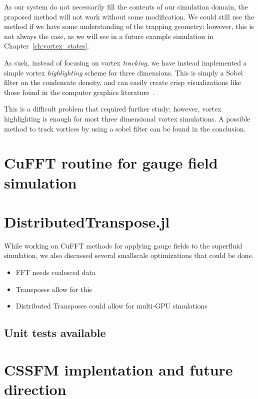 As our system do not necessarily fill the contents of our simulation domain, the proposed method will not work without some modification.
We could still use the method if we have some understanding of the trapping geometry; however, this is not always the case, as we will see in a future example simulation in Chapter~\ref{ch:vortex_states}.

As such, instead of focusing on vortex \textit{tracking}, we have instead implemented a simple vortex \textit{highlighting} scheme for three dimensions.
This is simply a Sobel filter on the condensate density, and can easily create crisp visualizations like those found in the computer graphics literature~\cite{guo2018}.


This is a difficult problem that required further study; however, vortex highlighting is enough for most three dimensional vortex simulations.
A possible method to track vortices by using a sobel filter can be found in the conclusion.

\section{CuFFT routine for gauge field simulation}

\section{DistributedTranspose.jl}
While working on CuFFT methods for applying gauge fields to the superfluid simulation, we also discussed several smallscale optimizations that could be done.

\begin{itemize}
\item{FFT needs coalesced data}
\item{Transposes allow for this}
\item{Distributed Transposes could allow for multi-GPU simulations}
\end{itemize}

\subsection{Unit tests available}

\section{CSSFM implentation and future direction}
